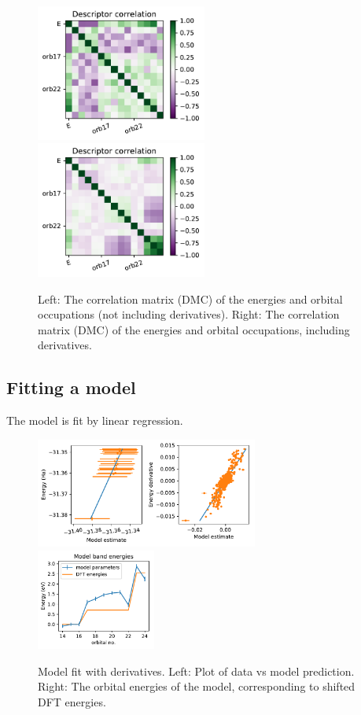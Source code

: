 \begin{figure}[h!]
\includegraphics[width=0.5\textwidth]{images/dmc_lowen_corrmat.pdf}
\includegraphics[width=0.5\textwidth]{images/dmc_allderivs_lowen_corrmat.pdf}
\label{fig:descriptors_corrmat}
\caption{
Left: The correlation matrix (DMC) of the energies and orbital occupations (not including derivatives). 
Right: The correlation matrix (DMC) of the energies and orbital occupations, including derivatives.}
\end{figure}

\subsection{Fitting a model}

The model is fit by linear regression.

\begin{figure}[h!]
\includegraphics[width=0.65\textwidth]{images/dmc_allderivs_lowen_model.pdf}
\includegraphics[width=0.35\textwidth]{images/dmc_allderivs_lowen_model_bands.pdf}
\label{fig:model_fit}
\caption{Model fit with derivatives. 
Left: Plot of data vs model prediction. 
Right: The orbital energies of the model, corresponding to shifted DFT energies.}
\end{figure}

  
  





